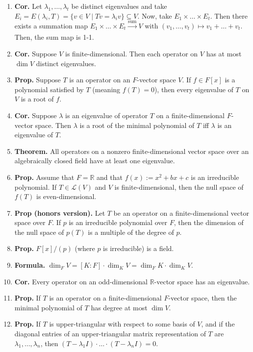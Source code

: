 \begin{enumerate}
	\item \textbf{Cor. } Let $\lambda_1,\dots,\lambda_t$ be distinct eigenvalues and take $E_i = E(\lambda_i,T) = \{v \in V \mid Tv = \lambda_iv\} \subseteq V$. Now, take $E_1 \times \dots \times E_t$. Then there exists a summation map $E_1 \times \dots \times E_t \xrightarrow[]{\textrm{sum}} V$ with $(v_1,\dots,v_t) \mapsto v_1 + \dots + v_t$. Then, the sum map is 1-1. 
	\item \textbf{Cor. } Suppose $V$ is finite-dimensional. Then each operator on $V$ has at most $\dim V$ distinct eigenvalues. 
	\item \textbf{Prop. } Suppose $T$ is an operator on an $F$-vector space $V$. If $f \in F[x]$ is a polynomial satisfied by $T$ (meaning $f(T)=0$), then every eigenvalue of $T$ on $V$ is a root of $f$. 
	\item \textbf{Cor. } Suppose $\lambda$ is an eigenvalue of operator $T$ on a finite-dimensional $F$-vector space. Then $\lambda$ is a root of the minimal polynomial of $T$ iff $\lambda$ is an eigenvalue of $T$. 
	\item \textbf{Theorem. } All operators on a nonzero finite-dimensional vector space over an algebraically closed field have at least one eigenvalue. 
	\item \textbf{Prop. } Assume that $F = \mathbb{R}$ and that $f(x) := x^2 + bx + c$ is an irreducible polynomial. If $T \in \mathscr{L}(V)$ and $V$ is finite-dimensional, then the null space of $f(T)$ is even-dimensional. 
	\item \textbf{Prop (honors version). } Let $T$ be an operator on a finite-dimensional vector space over $F$. If $p$ is an irreducible polynomial over $F$, then the dimension of the null space of $p(T)$ is a multiple of the degree of $p$. 
	\item \textbf{Prop. } $F[x] / (p)$ (where $p$ is irreducible) is a field. 
	\item \textbf{Formula. } $\dim_F V = [K:F] \cdot \dim_K V = \dim_F K \cdot \dim_K V$. 
	\item \textbf{Cor. } Every operator on an odd-dimensional $\mathbb{R}$-vector space has an eigenvalue. 
	\item \textbf{Prop. } If $T$ is an operator on a finite-dimensional $F$-vector space, then the minimal polynomial of $T$ has degree at most $\dim V$. 
	\item \textbf{Prop. } If $T$ is upper-triangular with respect to some basis of $V$, and if the diagonal entries of an upper-triangular matrix representation of $T$ are $\lambda_1,\dots,\lambda_n$, then $(T-\lambda_1I) \cdot \dots \cdot (T-\lambda_nI)=0$. 

\end{enumerate}
